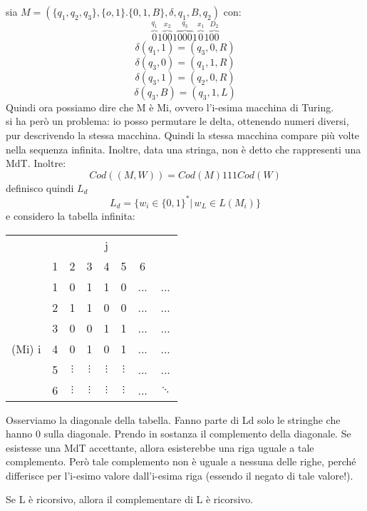 	\begin{example}
		sia $M=(\{q_1,q_2,q_3\},\{o,1\}.\{0,1,B\},\delta,q_1,B,q_2)$ con:
		$$\overbrace{0}^{q_1}1\overbrace{00}^{x_2}1\overbrace{000}^{q_3}1\overbrace{0}^{x_1}1\overbrace{00}^{D_2}$$
		$$\delta(q_1,1)=(q_3,0,R)$$
		$$\delta(q_3,0)=(q_1,1,R)$$
		$$\delta(q_3,1)=(q_2,0,R)$$
		$$\delta(q_3,B)=(q_3,1,L)$$
		Quindi ora possiamo dire che M è Mi, ovvero l'i-esima macchina di Turing.
		\\
		si ha però un problema: io posso permutare le delta, ottenendo numeri diversi, pur descrivendo la stessa
		macchina. Quindi la stessa macchina compare più volte nella sequenza infinita. Inoltre, data una
		stringa, non è detto che rappresenti una MdT. Inoltre:
		$$Cod((M,W))=Cod(M)111Cod(W)$$
		definisco quindi $L_d$
		$$L_d=\{w_i\in\{0,1\}^*|\,w_L\in L(M_i)\}$$
		e considero la tabella infinita:
		\begin{center}
			\begin{tabular}{c c|c c c c c c}
				       &   &          &          & j        &          &                \\
				       & 1 & 2        & 3        & 4        & 5        & 6              \\
				\hline
				       & 1 & 0        & 1        & 1        & 0        & ... & ...      \\
				       & 2 & 1        & 1        & 0        & 0        & ... & ...      \\
				       & 3 & 0        & 0        & 1        & 1        & ... & ...      \\
				(Mi) i & 4 & 0        & 1        & 0        & 1        & ... & ...      \\
				       & 5 & $\vdots$ & $\vdots$ & $\vdots$ & $\vdots$ & ... & ...      \\
				       & 6 & $\vdots$ & $\vdots$ & $\vdots$ & $\vdots$ & ... & $\ddots$
			\end{tabular}
		\end{center}
		Osserviamo la diagonale della tabella. Fanno parte di Ld solo le stringhe che hanno 0 sulla
		diagonale. Prendo in sostanza il complemento della diagonale.
		Se esistesse una MdT accettante, allora esisterebbe una riga uguale a tale complemento.
		Però tale complemento non è uguale a nessuna delle righe, perché differisce per l'i-esimo valore
		dall'i-esima riga (essendo il negato di tale valore!).
	\end{example}
	\begin{theorem}
		Se L è ricorsivo, allora il complementare di L è ricorsivo.
	\end{theorem}
